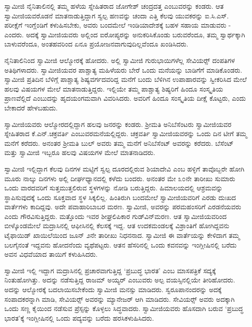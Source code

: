  ಸ್ವಾಮೀಜಿ ನೈನಿತಾಲಿನಲ್ಲಿ ತಮ್ಮ ಹಳೆಯ ಸ್ನೇಹಿತರಾದ ಜೋಗೇಶ್ ಚಂದ್ರದತ್ತ ಎಂಬುವರನ್ನು ಕಂಡರು. ಆತ ಸ್ವಾಮೀಜಿಯವರೊಡನೆ ಮಾತನಾಡುತ್ತಿದ್ದಾಗ ಸ್ವಲ್ಪ ಹಣವನ್ನು ಚಂದಾ ಎತ್ತಿ ಕೆಲವು ಯುವಕರನ್ನು ಐ.ಸಿ.ಎಸ್. ಪರೀಕ್ಷೆಗೆ ಇಂಗ್ಲೆಂಡಿಗೆ ಕಳುಹಿಸಬೇಕು, ಅವರು ಬಂದಮೇಲೆ ಇಂಡಿಯಾದೇಶಕ್ಕೆ ಬಹಳ ಸಹಾಯ ಮಾಡುವರು - ಎಂದರು. ಅದಕ್ಕೆ ಸ್ವಾಮೀಜಿಯವರು ಅಲ್ಲಿಂದ ಐರೋಪ್ಯರನ್ನು ಅನುಕರಿಸಿಕೊಂಡು ಬರುವರೆಂದೂ, ತಮ್ಮ ಸ್ವಾರ್ಥಕ್ಕಾಗಿ ಬಾಳುವರೆಂದೂ, ಅಂತಹವರಿಂದ ಏನೂ ಪ್ರಯೋಜನವಾಗುವುದಿಲ್ಲವೆಂದೂ ಖಂಡಿಸಿದರು. 

 ನೈನಿತಾಲಿನಿಂದ ಸ್ವಾಮೀಜಿ ಆಲ್ಮೋರಕ್ಕೆ ಹೋದರು. ಅಲ್ಲಿ ಸ್ವಾಮೀಜಿ ಗುರುಭಾಯಿಗಳೆಲ್ಲ ಸೇವಿಯರ್ಸ್‍‍ ದಂಪತಿಗಳ ಅತಿಥಿಗಳಾದರು. ಸ್ವಾಮೀಜಿಯವರ ಪಾಶ್ಚಾತ್ಯ ಮಹಿಳೆಯರು ಬೇರೆ ಒಂದು ಮನೆಯನ್ನು ಬಾಡಿಗೆಗೆ ಮಾಡಿಕೊಂಡರು. ಸ್ವಾಮೀಜಿ ಪ್ರತಿದಿನ ಬೆಳಿಗ್ಗೆ ಪಾಶ್ಚಾತ್ಯ ಶಿಷ್ಯವರ್ಗದವರಿದ್ದ ಮನೆಗೆ ಬಂದು ಬೆಳಿಗಿನ ಉಪಾಹಾರವನ್ನು ಸ್ವೀಕರಿಸಿದ ಮೇಲೆ ಹಲವು ವಿಷಯಗಳ ಮೇಲೆ ಮಾತನಾಡುತ್ತಿದ್ದರು. ಇಲ್ಲಿಯೇ ತಮ್ಮ ಪಾಶ್ಚಾತ್ಯ ಶಿಷ್ಯರಿಗೆ ಹಿಂದೂ ಸಂಸ್ಕೃತಿಯ ಪ್ರಾಣವೆಲ್ಲಿದೆ ಎಂಬುದನ್ನು ಹೃದಯಂಗಮವಾಗಿ ವಿವರಿಸಿದರು. ಅವರಿಗೆ ಹಿಂದೂ ಸಂಸ್ಕೃತಿಯ ದೀಕ್ಷೆ ಕೊಟ್ಟರು, ಎಂದು ಬೇಕಾದರೆ ಹೇಳಬಹುದು. 

 ಸ್ವಾಮೀಜಿಯವರು ಆಲ್ಮೋರದಲ್ಲಿದ್ದಾಗ ಹಲವು ಜನರನ್ನು ಕಂಡರು. ಶ‍್ರೀಮತಿ ಅನಿಬೆಸೆಂಟರು ಸ್ವಾಮೀಜಿಯವರ ಸ್ನೇಹಿತರಾದ ಕೆ.ಎನ್.ಚಕ್ರವರ್ತಿ ಎಂಬುವರ\break ಮನೆಯಲ್ಲಿದ್ದರು. ಚಕ್ರವರ್ತಿ ಸ್ವಾಮೀಜಿಯವರನ್ನು ಒಂದು ದಿನ ಟೀಗೆ ತಮ್ಮ ಮನೆಗೆ ಕರೆದರು. ಅನಂತರ ಶ‍್ರೀಮತಿ ಬುಲ್ ಅವರು ತಮ್ಮ ಮನೆಗೆ ಅನಿಬೆಸೆಂಟ್ ಅವರನ್ನು ಕರೆದರು. ಬೆಸೆಂಟ್ ಮತ್ತು ಸ್ವಾಮೀಜಿ ಇಬ್ಬರೂ ಹಲವು ವಿಷಯಗಳ ಮೇಲೆ ಮಾತನಾಡಿದರು. 

 ಸ್ವಾಮೀಜಿ ಇಲ್ಲಿದ್ದಾಗ ಕೆಲವು ದಿನಗಳ ಮಟ್ಟಿಗೆ ಸ್ವಲ್ಪ ದೂರದಲ್ಲಿರುವ ಶಿಯಾದೇವಿ ಎಂಬ ಹಳ್ಳಿಗೆ ತಾವೊಬ್ಬರೇ ಹೋಗಿ ಮೂರು ನಾಲ್ಕು ದಿನಗಳು ಅಲ್ಲಿ ದೀರ್ಘಧ್ಯಾನದಲ್ಲಿ ಕಳೆದು ಬಂದರು. ಅನಂತರ ಮೇ ೩೦ನೇ ತಾರೀಖು ಸುಮಾರು ಒಂದು ವಾರದವರಿಗೆ ಸುತ್ತಮುತ್ತಲಿರುವ ಸ್ಥಳಗಳನ್ನು ನೋಡಿ ಬರುತ್ತಿದ್ದರು. ಹಿಮಾಲಯದಲ್ಲಿ ಆಶ್ರಮವನ್ನು ಸ್ಥಾಪಿಸುವುದಕ್ಕೆ ಒಂದು ಸೂಕ್ತವಾದ ಸ್ಥಳ ಸಿಕ್ಕಲಿಲ್ಲ. ಹಿಂತಿರುಗಿ ಬಂದಮೇಲೆ ಸ್ವಾಮೀಜಿಯವರಿಗೆ ಎರಡು ದುಃಖದ ವಾರ್ತೆಗಳು ಕಾದಿದ್ದವು. ಅದೇ ಪವಾಹಾರಿಬಾಬರ ಮರಣ. ಸ್ವಾಮೀಜಿ, ಅವರನ್ನು ಪರಮಹಂಸರಿಗೆ ಎರಡನೆಯವರು ಎಂದು ಗೌರವಿಸುತ್ತಿದ್ದರು. ಮತ್ತೊಂದು ಇವರ ಶೀಘ್ರಲಿಪಿಕಾರ ಗುಡ್‍ವಿನ್​ಮರಣ. ಆತ ಸ್ವಾಮೀಜಿಯವರಿಂದ ಬೀಳ್ಕೊಂಡಮೇಲೆ ಮದ್ರಾಸಿನಲ್ಲಿ  ಆಫೀಸಿನಲ್ಲಿ ಕೆಲಸಕ್ಕೆ ಇದ್ದ. ಆತ ಉದಕಮಂಡಲಕ್ಕೆ ವಿಶ್ರಾಂತಿಗೆ ಹೋಗಿದ್ದವನು ಟೈಫಾಯಿಡ್ ಖಾಯಿಲೆಯಿಂದ ಜೂನ್ ೨ನೇ ತಾರೀಖು ನಿಧನನಾದ. ಸ್ವಾಮೀಜಿ ಈ ವಾರ್ತೆಯನ್ನು ಕೇಳಿದಾಗ ತಮ್ಮ ಬಲಗೈನಂತೆ ಇದ್ದವನು ಹೋದನೆಂದು ವ್ಯಥೆಪಟ್ಟರು. ಆತನ ಹೆಸರಿನಲ್ಲಿ ಒಂದು ಕವನವನ್ನು ಇಂಗ್ಲೀಷಿನಲ್ಲಿ ಬರೆದು ಅವನ ವಿಧವೆಯಾದ ತಾಯಿಗೆ ಕಳುಹಿಸಿದರು. 

 ಸ್ವಾಮೀಜಿ ಇಲ್ಲಿ ಇದ್ದಾಗ ಮದ್ರಾಸಿನಲ್ಲಿ ಪ್ರಚಾರವಾಗುತ್ತಿದ್ದ ‘ಪ್ರಬುದ್ಧ ಭಾರತ’ ಎಂಬ ಮಾಸಪತ್ರಿಕೆ ಸದ್ಯಕ್ಕೆ ನಿಂತುಹೋಗಿತ್ತು. ಅದನ್ನು ನಡೆಸುತ್ತಿದ್ದ ರಾಜಮ್ ಅಯ್ಯರ್ ಎಂಬುವರು ಅಲ್ಪ ವಯಸ್ಸಿನಲ್ಲಿಯೇ ತೀರಿಹೋದರು. ಅದನ್ನು ಆಲ್ಮೋರಕ್ಕೆ ಬದಲಾಯಿಸಬೇಕೆಂದು ಸ್ವಾಮೀಜಿ ಮನಸ್ಸು ಮಾಡಿದರು. ಸ್ವರೂಪಾನಂದರನ್ನು ಅದಕ್ಕೆ ಸಂಪಾದಕರನ್ನಾಗಿ ಮಾಡಿ, ಸೇವಿಯರ್ಸ್‍‍ ಅವರನ್ನು ಮ್ಯಾನೇಜರ್ ಆಗಿ ಮಾಡಿದರು. ಸೇವಿಯರ್ಸ್‍‍ ಅವರು ಅದಕ್ಕಾಗಿ ಒಂದು ಸಣ್ಣ ಕೈಯಿಂದ ನಡೆಸುವ ಪ್ರೆಸ್ಸನ್ನು ಕೊಳ್ಳಲು ಸಿದ್ಧವಾದರು. ಸ್ವಾಮೀಜಿಯವರು ಹೊಸದಾಗಿ ಬರುವ ‘ಪ್ರಬುದ್ಧ ಭಾರತ’ಕ್ಕೆ ಇಂಗ್ಲೀಷಿನಲ್ಲಿ ಒಂದು ಪದ್ಯವನ್ನು ಬರೆದು ಹರಸಿಕಳುಹಿಸಿದರು. 

